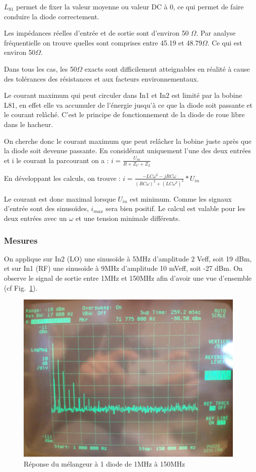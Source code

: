 \documentclass{article}
\begin{document}
$L_{81}$ permet de fixer la valeur moyenne ou valeur DC à 0, ce qui permet de faire conduire la diode correctement.


Les impédances réelles d'entrée et de sortie sont d'environ 50 $\Omega$. Par analyse fréquentielle on trouve quelles sont comprises entre 45.19 et 48.79$\Omega$. Ce qui est environ 50$\Omega$.

Dans tous les cas, les 50$\Omega$ exacts sont difficilement atteignables en réalité à cause des tolérances des résistances et aux facteurs environnementaux.


Le courant maximum qui peut circuler dans In1 et In2 est limité par la bobine L81, en effet elle va accumuler de l'énergie jusqu'à ce que la diode soit passante et le courant relâché. C'est le principe de fonctionnement de la diode de roue libre dans le hacheur.

On cherche donc le courant maximum que peut relâcher la bobine juste après que la diode soit devenue passante.
En considérant uniquement l'une des deux entrées et i le courant la parcourant on a :
$i=\frac{U_{in}}{R+Z_{C}+Z_{L}}$

En développant les calculs, on trouve : $i=\frac{-LC\omega^{2}-jRC\omega}{(RC\omega)^{2}+(LC\omega^{2})^{2}}*U_{in}$

Le courant est donc maximal lorsque $U_{in}$ est minimum. Comme les signaux d'entrée sont des sinusoïdes, $i_{max}$ sera bien positif.
Le calcul est valable pour les deux entrées avec un $\omega$ et une tension minimale différents.

\subsubsection{Mesures}


On applique sur In2 (LO) une sinusoïde à 5MHz d'amplitude 2 Veff, soit 19 dBm, et sur In1 (RF) une sinusoïde à 9MHz d'amplitude 10 mVeff, soit -27 dBm.
On observe le signal de sortie entre 1MHz et 150MHz afin d'avoir une vue d'ensemble (cf Fig.~\ref{fig:11_3_1}).

\begin{figure}[h!]
	\centering
	\includegraphics[width=.7\textwidth]{11_3_1}
	\caption{Réponse du mélangeur à 1 diode de 1MHz à 150MHz}
	\label{fig:11_3_1}
\end{figure}
\end{document}
